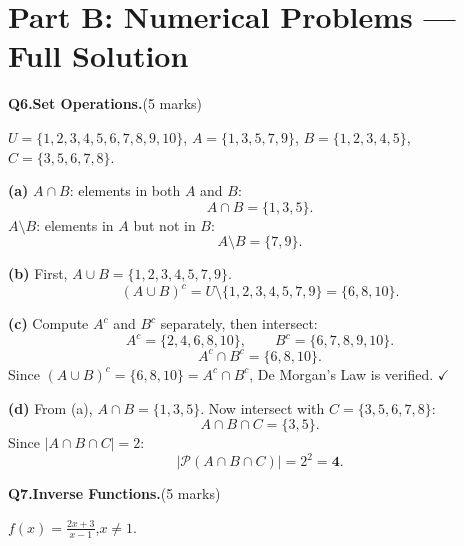 \documentclass[11pt]{article}
\begin{document}
\section{Part B: Numerical Problems --- Full Solution}

\noindent\textbf{Q6.}\quad\textbf{Set Operations.}\quad(5 marks)

\medskip
\begin{databox}
\small
$U = \{1,2,3,4,5,6,7,8,9,10\}$,\quad
$A = \{1,3,5,7,9\}$,\quad
$B = \{1,2,3,4,5\}$,\quad
$C = \{3,5,6,7,8\}$.
\end{databox}



\begin{solutionbox}
\textbf{(a)} $A \cap B$: elements in both $A$ and $B$:
\[A \cap B = \{1,3,5\}.\]
$A \setminus B$: elements in $A$ but not in $B$:
\[A \setminus B = \{7,9\}.\]

\medskip
\textbf{(b)} First, $A \cup B = \{1,2,3,4,5,7,9\}$.
\[(A \cup B)^c = U \setminus \{1,2,3,4,5,7,9\} = \{6,8,10\}.\]

\medskip
\textbf{(c)} Compute $A^c$ and $B^c$ separately, then intersect:
\[A^c = \{2,4,6,8,10\}, \qquad B^c = \{6,7,8,9,10\}.\]
\[A^c \cap B^c = \{6,8,10\}.\]
Since $(A \cup B)^c = \{6,8,10\} = A^c \cap B^c$, De Morgan's Law is verified. $\checkmark$

\medskip
\textbf{(d)} From (a), $A \cap B = \{1,3,5\}$. Now intersect with $C = \{3,5,6,7,8\}$:
\[A \cap B \cap C = \{3,5\}.\]
Since $|A \cap B \cap C| = 2$:
\[\bigl|\mathcal{P}(A \cap B \cap C)\bigr| = 2^2 = \mathbf{4}.\]
\end{solutionbox}



\bigskip

\noindent\textbf{Q7.}\quad\textbf{Inverse Functions.}\quad(5 marks)

\medskip
\begin{databox}
\small $\displaystyle f(x) = \frac{2x+3}{x-1}$,\quad $x \neq 1$.
\end{databox}

\medskip
\end{document}
